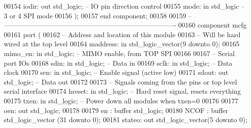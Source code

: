 \begin{DoxyCode}
00154         iodir: \textcolor{keywordflow}{out} \textcolor{comment}{std\_logic};                                               \textcolor{keyword}{-- IO pin direction control}
00155         mode: \textcolor{keywordflow}{in} \textcolor{comment}{std\_logic}\textcolor{keyword}{                                                  -- 3 or 4 SPI mode}
00156     );
00157 \textcolor{keywordflow}{end} \textcolor{keywordflow}{component};
00158 
00159 \textcolor{keyword}{-- ----------------------------------------------------------------------------}
00160 \textcolor{keywordflow}{component} mcfg
00161     \textcolor{keywordflow}{port} (
00162 \textcolor{keyword}{        -- Address and location of this module}
00163 \textcolor{keyword}{        -- Will be hard wired at the top level}
00164         maddress: \textcolor{keywordflow}{in} \textcolor{comment}{std\_logic\_vector}(\textcolor{vhdllogic}{}\textcolor{vhdllogic}{9} \textcolor{keywordflow}{downto} \textcolor{vhdllogic}{}\textcolor{vhdllogic}{0});
00165         mimo\_en: \textcolor{keywordflow}{in} \textcolor{comment}{std\_logic};  \textcolor{keyword}{-- MIMO enable, from TOP SPI}
00166     
00167 \textcolor{keyword}{        -- Serial port IOs}
00168         sdin: \textcolor{keywordflow}{in} \textcolor{comment}{std\_logic};     \textcolor{keyword}{-- Data in}
00169         sclk: \textcolor{keywordflow}{in} \textcolor{comment}{std\_logic};     \textcolor{keyword}{-- Data clock}
00170         sen: \textcolor{keywordflow}{in} \textcolor{comment}{std\_logic};  \textcolor{keyword}{-- Enable signal (active low)}
00171         sdout: \textcolor{keywordflow}{out} \textcolor{comment}{std\_logic};   \textcolor{keyword}{-- Data out}
00172     
00173 \textcolor{keyword}{        -- Signals coming from the pins or top level serial interface}
00174         hreset: \textcolor{keywordflow}{in} \textcolor{comment}{std\_logic};   \textcolor{keyword}{-- Hard reset signal, resets everything}
00175         txen: \textcolor{keywordflow}{in} \textcolor{comment}{std\_logic}; \textcolor{keyword}{-- Power down all modules when txen=0}
00176         
00177         oen: \textcolor{keywordflow}{out} \textcolor{comment}{std\_logic};
00178         
00179         en      : \textcolor{keywordflow}{buffer} \textcolor{comment}{std\_logic};
00180         NCOF    : \textcolor{keywordflow}{buffer} \textcolor{comment}{std\_logic\_vector} (\textcolor{vhdllogic}{}\textcolor{vhdllogic}{31} \textcolor{keywordflow}{downto} \textcolor{vhdllogic}{}\textcolor{vhdllogic}{0});
00181         stateo: \textcolor{keywordflow}{out} \textcolor{comment}{std\_logic\_vector}(\textcolor{vhdllogic}{}\textcolor{vhdllogic}{5} \textcolor{keywordflow}{downto} \textcolor{vhdllogic}{}\textcolor{vhdllogic}{0});

\end{DoxyCode}
